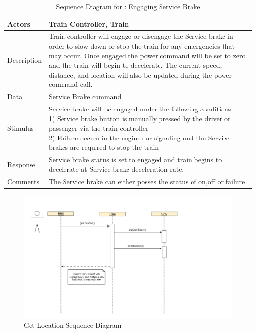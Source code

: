 \documentclass[]{article}
\begin{document}
\begin{table}[H]
	\centering
	\caption{Sequence Diagram for : Engaging Service Brake}
	\begin{tabular}{|l|l|}
		\hline
		Actors & \parbox[t]{10cm}{Train Controller, Train} \\ \hline
		Description & \parbox[t]{10cm}{Train controller will engage or disengage the Service brake in order to slow down or stop the train for any emergencies that may occur. Once engaged the power command will be set to zero and the train will begin to decelerate. The current speed, distance, and location will also be updated during the power command call.} \\ \hline
		Data &  \parbox[t]{10cm}{Service Brake command } \\ \hline
		Stimulus &  \parbox[t]{10cm}{Service brake will be engaged under the following conditions:\\1) Service brake button is manually pressed by the driver or passenger via the train controller\\2) Failure occurs in the engines or signaling and the Service brakes are required to stop the train  } \\ \hline
		Response & \parbox[t]{10cm}{Service brake status is set to engaged and train begins to decelerate at Service brake deceleration rate.}\\ \hline
		Comments & \parbox[t]{10cm}{The Service brake can either posses the status of on,off or failure}  \\ \hline
	\end{tabular}
\end{table}

\begin{figure}[H]
	\centering
	\includegraphics[scale=.3]{train_model_sqd_get_location.png}
	\caption{Get Location Sequence Diagram}
\end{figure}
\end{document}
